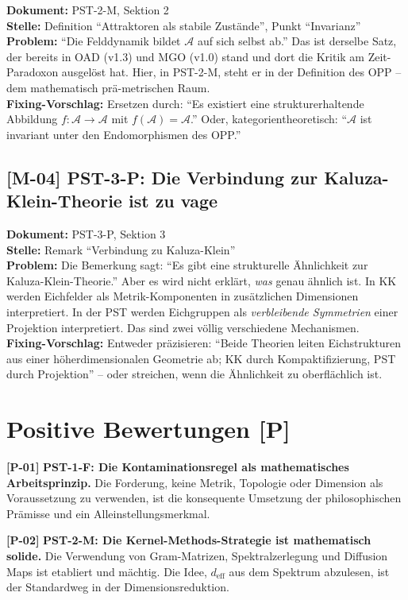 \documentclass[11pt,a4paper]{article}
\newcommand{\M}[1]{\textbf{[M-#1]}}
\newcommand{\Pos}[1]{\textbf{[P-#1]}}
\newcommand{\Dok}[1]{\textbf{Dokument:} #1\\}
\newcommand{\Stelle}[1]{\textbf{Stelle:} #1\\}
\newcommand{\Prob}[1]{\textbf{Problem:} #1\\}
\newcommand{\Fix}[1]{\textbf{Fixing-Vorschlag:} #1\\}
\begin{document}
\Dok{PST-2-M, Sektion 2}
\Stelle{Definition ``Attraktoren als stabile Zust\"{a}nde'', Punkt
``Invarianz''}
\Prob{``Die Felddynamik bildet $\mathcal{A}$ auf sich selbst ab.''
Das ist derselbe Satz, der bereits in OAD (v1.3) und MGO (v1.0)
stand und dort die Kritik am Zeit-Paradoxon ausgel\"{o}st hat. Hier,
in PST-2-M, steht er in der Definition des OPP -- dem
mathematisch pr\"{a}-metrischen Raum.}
\Fix{Ersetzen durch: ``Es existiert eine strukturerhaltende
Abbildung $f: \mathcal{A} \to \mathcal{A}$ mit $f(\mathcal{A}) =
\mathcal{A}$.'' Oder, kategorientheoretisch: ``$\mathcal{A}$ ist
invariant unter den Endomorphismen des OPP.''}

\subsection{\M{04} PST-3-P: Die Verbindung zur Kaluza-Klein-Theorie
ist zu vage}

\Dok{PST-3-P, Sektion 3}
\Stelle{Remark ``Verbindung zu Kaluza-Klein''}
\Prob{Die Bemerkung sagt: ``Es gibt eine strukturelle \"{A}hnlichkeit
zur Kaluza-Klein-Theorie.'' Aber es wird nicht erkl\"{a}rt, \emph{was}
genau \"{a}hnlich ist. In KK werden Eichfelder als
Metrik-Komponenten in zus\"{a}tzlichen Dimensionen interpretiert. In
der PST werden Eichgruppen als \emph{verbleibende Symmetrien} einer
Projektion interpretiert. Das sind zwei v\"{o}llig verschiedene
Mechanismen.}
\Fix{Entweder pr\"{a}zisieren: ``Beide Theorien leiten Eichstrukturen
aus einer h\"{o}herdimensionalen Geometrie ab; KK durch
Kompaktifizierung, PST durch Projektion'' -- oder streichen, wenn
die \"{A}hnlichkeit zu oberfl\"{a}chlich ist.}

\newpage

\section{Positive Bewertungen [P]}

\Pos{01} \textbf{PST-1-F: Die Kontaminationsregel als mathematisches
Arbeitsprinzip.} Die Forderung, keine Metrik, Topologie oder
Dimension als Voraussetzung zu verwenden, ist die konsequente
Umsetzung der philosophischen Pr\"{a}misse und ein Alleinstellungsmerkmal.

\Pos{02} \textbf{PST-2-M: Die Kernel-Methods-Strategie ist mathematisch
solide.} Die Verwendung von Gram-Matrizen, Spektralzerlegung und
Diffusion Maps ist etabliert und m\"{a}chtig. Die Idee, $d_{\text{eff}}$
aus dem Spektrum abzulesen, ist der Standardweg in der
Dimensionsreduktion.
\end{document}
